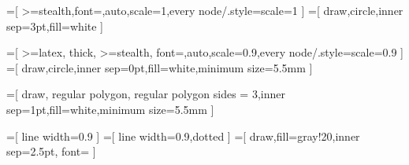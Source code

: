 =[
  >=stealth,font=\small,auto,scale=1,every node/.style={scale=1}
]
=[
  draw,circle,inner sep=3pt,fill=white
]


=[
  >=latex, thick, >=stealth, font=\small,auto,scale=0.9,every node/.style={scale=0.9}
]
=[
  draw,circle,inner sep=0pt,fill=white,minimum size=5.5mm
]

=[
  draw, regular polygon, regular polygon sides = 3,inner sep=1pt,fill=white,minimum size=5.5mm
]

=[
    line width=0.9
]
=[
    line width=0.9,dotted
]
=[
  draw,fill=gray!20,inner sep=2.5pt, font=\small
]



\usetikzlibrary{positioning}

\newtheorem{theorem}{Theorem}
\newtheorem{definition}{Definition}
\newtheorem{conjecture}{Conjecture}
\newtheorem{lemma}{Lemma}
\newtheorem{exercise}{Exercise}
\newtheorem{remark}{Remark}


\usepackage{xcolor}



\lstset{style=mystyle}

\newcommand{\defn}[1]{\textbf{#1}}
\newcommand{\dbracket}[1]{\left \llbracket {#1} \right \rrbracket}
\newcommand{\dist}[1]{\mathtt{Dist}(#1)}
\newcommand{\true}[0]{\texttt{true}}
\newcommand{\rmd}[0]{\mathrm{d}}
\newcommand{\E}[0]{\mathbb{E}}
\newcommand{\te}[0]{\texttt{e}}
\newcommand{\false}[0]{\texttt{false}}
\newcommand{\real}[0]{\mathbb{R}}
\newcommand{\rational}[0]{\mathbb{Q}}
\newcommand{\lebesgue}[0]{\mathbb{L}}
\newcommand{\eval}[0]{\mathrm{ev}}
\newcommand{\disc}[0]{\textsc{Disc}}
\newcommand{\borel}[0]{\mathcal{B}}
\newcommand{\calF}[0]{\mathcal{F}}
\newcommand{\ent}[0]{\mathbb{S}}
\newcommand{\prog}[0]{\texttt{p}}
\newcommand{\bool}[0]{\mathbb{B}}
\newcommand{\nat}[0]{\mathbb{N}}
\newcommand{\cont}[0]{\textsc{Cont}}
\newcommand{\prop}[0]{\textsc{Prop}}
\newcommand{\bdd}[0]{\textsc{Bdd}}
\newcommand{\robdd}[0]{\textsc{Robdd}}
\newcommand{\compiles}[0]{\rightsquigarrow}

